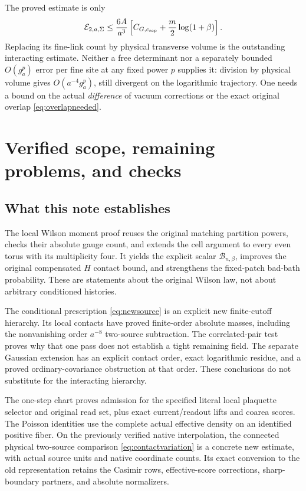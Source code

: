 \documentclass[11pt,letterpaper]{article}
\theoremstyle{plain}
\theoremstyle{remark}\newtheorem{remark}[theorem]{Scope}
\begin{document}
The proved estimate is only
\begin{equation}
\mathcal E_{2,a,\Sigma}\le
\frac{6A}{a^3}\left[C_{G,c_{\rm rep}}+\frac m2\log(1+\beta)\right].
\label{eq:purityproved}
\end{equation}
Replacing its fine-link count by physical transverse volume is the outstanding
interacting estimate. Neither a free determinant nor a separately bounded
$O(g_a^p)$ error per fine site at any fixed power $p$ supplies it: division
by physical volume gives $O(a^{-4}g_a^p)$, still divergent on the logarithmic
trajectory. One needs a bound on the actual \emph{difference} of vacuum
corrections or the exact original overlap \eqref{eq:overlapneeded}.

\section{Verified scope, remaining problems, and checks}
\label{sec:status}

\subsection{What this note establishes}

The local Wilson moment proof reuses the original matching partition powers,
checks their absolute gauge count, and extends the cell argument to every even
torus with its multiplicity four. It yields the explicit scalar
$\mathcal B_{n,\beta}$, improves the original compensated $H$ contact bound,
and strengthens the fixed-patch bad-bath probability. These are statements
about the original Wilson law, not about arbitrary conditioned histories.

The conditional prescription \eqref{eq:newsource} is an explicit new
finite-cutoff hierarchy. Its local contacts have proved finite-order absolute
masses, including the nonvanishing order $a^{-8}$ two-source subtraction.
The correlated-pair test proves why that one pass does not establish a tight
remaining field. The separate Gaussian extension has an explicit contact
order, exact logarithmic residue, and a proved ordinary-covariance obstruction
at that order. These conclusions do not substitute for the interacting hierarchy.

The one-step chart proves admission for the specified literal local plaquette
selector and original read set, plus exact current/readout lifts and coarea
scores. The Poisson identities use the complete actual effective density on
an identified positive fiber. On the previously verified native interpolation,
the connected physical two-source comparison \eqref{eq:contactvariation} is
a concrete new estimate, with actual source units and native coordinate counts.
Its exact conversion to the old representation retains the Casimir rows,
effective-score corrections, sharp-boundary partners, and absolute normalizers.
\end{document}
